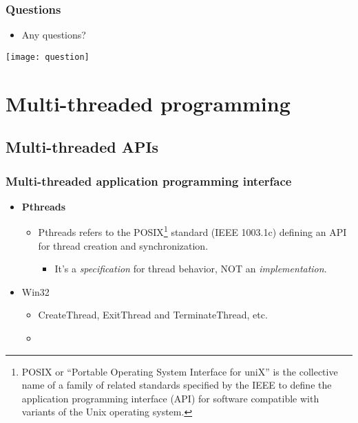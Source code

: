 \documentclass[CJKutf8,xcolor=pdftex,dvipsnames,table]{beamer}
\begin{document}
\begin{CJK*}{UTF8}{song}
  \fi
  
  \fi

  \begin{frame}
  \frametitle{Questions}
  \begin{itemize}
  \item{Any questions?}
  \end{itemize}
  \begin{center}
    \texttt{[image: question]}
  \end{center}
  \end{frame}

  \section{Multi-threaded programming}

\iffalse

  \begin{frame}
  \frametitle{Multi-threaded programming} \pause
  \begin{itemize}
  \item{Application programming interfaces (APIs)} \pause
  \item{Writing multi-threaded code}
  \end{itemize}
  \end{frame}

\fi

  \subsection{Multi-threaded APIs}

  \begin{frame}
  \frametitle{Multi-threaded application programming interface} \pause
  \begin{itemize}
  \item{\textbf{Pthreads}} \pause
    \begin{itemize}
    \item{Pthreads refers to the POSIX\footnote{POSIX or ``Portable Operating System Interface for uniX'' is the collective name of a family of related standards specified by the IEEE to define the application programming interface (API) for software compatible with variants of the Unix operating system.} standard (IEEE 1003.1c) defining an API for thread creation and synchronization.} \pause
      \begin{itemize}
      \item{It's a \emph{specification} for thread behavior, NOT an \emph{implementation}.} \pause
      \end{itemize}
    \end{itemize}
  \item{Win32} \pause
    \begin{itemize}
    \item{CreateThread, ExitThread and TerminateThread, etc.} \pause
    \item{}
    \end{itemize}
  \end{itemize}
  \end{frame}


\end{CJK*}
\end{document}
